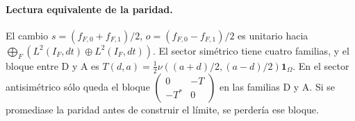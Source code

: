 \paragraph{Lectura equivalente de la paridad.}
El cambio $s=(f_{F,0}+f_{F,1})/2$, $o=(f_{F,0}-f_{F,1})/2$
es unitario hacia $\bigoplus_F(L^2(I_F,dt)\oplus L^2(I_F,dt))$.
El sector simétrico tiene cuatro familias, y el bloque entre D y A es
$T(d,a)=\tfrac12\nu((a+d)/2,(a-d)/2)\mathbf1_\Omega$.
En el sector antisimétrico sólo queda el bloque
$\left(\begin{smallmatrix}0&-T\\-T^*&0\end{smallmatrix}\right)$ en las familias D y A.
Si se promediase la paridad antes de construir el límite, se perdería ese bloque.

